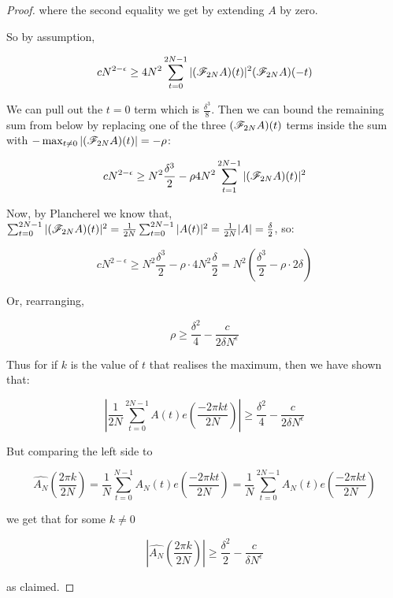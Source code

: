 \documentclass{report}
\theoremstyle{remark}
\numberwithin{equation}{section}
\begin{document}
\begin{proof}
  where the second equality we get by extending $A$ by zero.  
  
  So by assumption, 

  \[cN^{2-\epsilon} \geq 4 N^2 \sum_{t=0}^{2N-1} |(\mathscr{F}_{2N}A)(t)|^2(\mathscr{F}_{2N}A)(-t)\]

  We can pull out the $t = 0$ term which is $\frac{\delta^3}{8}$.  Then we can
  bound the remaining sum from below by replacing one of the three
  $(\mathscr{F}_{2N} A)(t)$ terms inside the sum with
  $-\max_{t\neq 0} |(\mathscr{F}_{2N} A)(t)| = -\rho$:
  
  \[cN^{2-\epsilon} \geq N^2 \frac{\delta^3}{2} - \rho 4 N^2 \sum_{t=1}^{2N-1} |(\mathscr{F}_{2N} A)(t)|^2\]

  Now, by Plancherel we know that,
  $\sum_{t=0}^{2N-1} |(\mathscr{F}_{2N}A)(t)|^2 = \frac{1}{2N}
  \sum_{t=0}^{2N-1} |A(t)|^2 = \frac{1}{2N} |A| = \frac{\delta}{2}$,
  so:

  \[cN^{2-\epsilon} \geq N^2 \frac{\delta^3}{2} - \rho \cdot 4N^2
    \frac{\delta}{2} = N^2\left(\frac{\delta^3}{2} - \rho\cdot 2
      \delta \right)\]

  Or, rearranging, 

  \[\rho \geq \frac{\delta^2}{4} - \frac{c}{2\delta N^\epsilon}\]

  Thus for if $k$ is the value of $t$ that realises the maximum, then we
  have shown that: 
  
  \[\left|\frac{1}{2N} \sum_{t=0}^{2N-1} A(t) e(\frac{-2\pi k
        t}{2N})\right| \geq \frac{\delta^2}{4} - \frac{c}{2\delta N^\epsilon}\]
  
  But comparing the left side to 
  
  \[\widehat{A_N}(\frac{2\pi k}{2N}) = \frac{1}{N}\sum_{t=0}^{N-1} A_N(t) e(\frac{-2\pi k
      t}{2N}) = \frac{1}{N}\sum_{t=0}^{2N-1} A_N(t) e(\frac{-2\pi k
      t}{2N})\]
  
  we get that for some $k \neq 0$

  \[|\widehat{A_N}(\frac{2\pi k}{2N})| \geq \frac{\delta^2}{2} - \frac{c}{\delta
      N^\epsilon}\]

  as claimed.
\end{proof}
\end{document}
